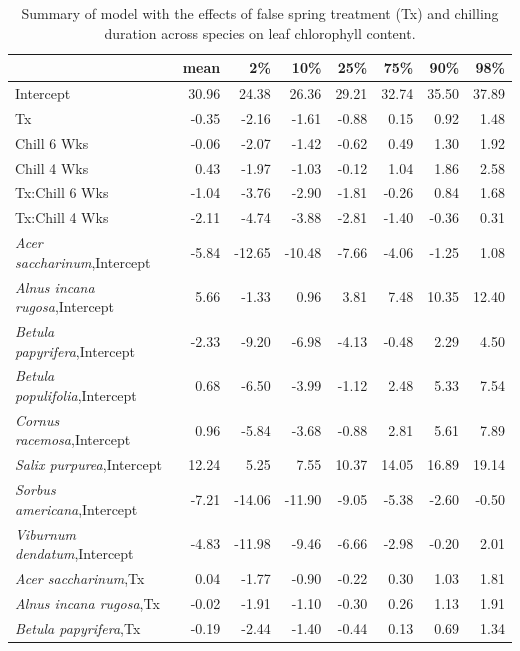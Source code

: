 \documentclass{article}\usepackage[]{graphicx}\usepackage[]{color}
\begin{document}
  
\newpage
\begin{longtable}{lrrrrrrr}
\caption{Summary of model with the effects of false spring treatment (Tx) and chilling duration across species on leaf chlorophyll content.} \\ 
  \hline
 & mean & 2\% & 10\% & 25\% & 75\% & 90\% & 98\% \\ 
  \hline \endhead  \hline
Intercept & 30.96 & 24.38 & 26.36 & 29.21 & 32.74 & 35.50 & 37.89 \\ 
  Tx & -0.35 & -2.16 & -1.61 & -0.88 & 0.15 & 0.92 & 1.48 \\ 
  Chill 6 Wks & -0.06 & -2.07 & -1.42 & -0.62 & 0.49 & 1.30 & 1.92 \\ 
  Chill 4 Wks & 0.43 & -1.97 & -1.03 & -0.12 & 1.04 & 1.86 & 2.58 \\ 
  Tx:Chill 6 Wks & -1.04 & -3.76 & -2.90 & -1.81 & -0.26 & 0.84 & 1.68 \\ 
  Tx:Chill 4 Wks & -2.11 & -4.74 & -3.88 & -2.81 & -1.40 & -0.36 & 0.31 \\ 
  \textit{Acer saccharinum},Intercept & -5.84 & -12.65 & -10.48 & -7.66 & -4.06 & -1.25 & 1.08 \\ 
  \textit{Alnus incana rugosa},Intercept & 5.66 & -1.33 & 0.96 & 3.81 & 7.48 & 10.35 & 12.40 \\ 
  \textit{Betula papyrifera},Intercept & -2.33 & -9.20 & -6.98 & -4.13 & -0.48 & 2.29 & 4.50 \\ 
  \textit{Betula populifolia},Intercept & 0.68 & -6.50 & -3.99 & -1.12 & 2.48 & 5.33 & 7.54 \\ 
  \textit{Cornus racemosa},Intercept & 0.96 & -5.84 & -3.68 & -0.88 & 2.81 & 5.61 & 7.89 \\ 
  \textit{Salix purpurea},Intercept & 12.24 & 5.25 & 7.55 & 10.37 & 14.05 & 16.89 & 19.14 \\ 
  \textit{Sorbus americana},Intercept & -7.21 & -14.06 & -11.90 & -9.05 & -5.38 & -2.60 & -0.50 \\ 
  \textit{Viburnum dendatum},Intercept & -4.83 & -11.98 & -9.46 & -6.66 & -2.98 & -0.20 & 2.01 \\ 
  \textit{Acer saccharinum},Tx & 0.04 & -1.77 & -0.90 & -0.22 & 0.30 & 1.03 & 1.81 \\ 
  \textit{Alnus incana rugosa},Tx & -0.02 & -1.91 & -1.10 & -0.30 & 0.26 & 1.13 & 1.91 \\ 
  \textit{Betula papyrifera},Tx & -0.19 & -2.44 & -1.40 & -0.44 & 0.13 & 0.69 & 1.34 \\ 

\end{longtable}
\end{document}
